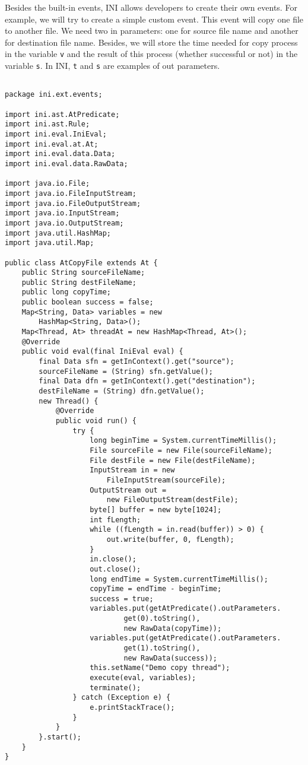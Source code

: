 \documentclass[11pt]{article}
\begin{document}
Besides the built-in events, INI allows developers to create their own events. For example, we will try to create a simple custom event. This event will copy one file to another file. We need two in parameters: one for source file name and another for destination file name. Besides, we will store the time needed for copy process in the variable \texttt{v} and the result of this process (whether successful or not) in the variable \texttt{s}. In INI, \texttt{t} and \texttt{s} are examples of out parameters.
\begin{lstlisting}

package ini.ext.events;

import ini.ast.AtPredicate;
import ini.ast.Rule;
import ini.eval.IniEval;
import ini.eval.at.At;
import ini.eval.data.Data;
import ini.eval.data.RawData;

import java.io.File;
import java.io.FileInputStream;
import java.io.FileOutputStream;
import java.io.InputStream;
import java.io.OutputStream;
import java.util.HashMap;
import java.util.Map;

public class AtCopyFile extends At {
	public String sourceFileName;
	public String destFileName;
	public long copyTime;
	public boolean success = false;
	Map<String, Data> variables = new 
        HashMap<String, Data>();
	Map<Thread, At> threadAt = new HashMap<Thread, At>();
	@Override
	public void eval(final IniEval eval) {
		final Data sfn = getInContext().get("source");
		sourceFileName = (String) sfn.getValue();
		final Data dfn = getInContext().get("destination");
		destFileName = (String) dfn.getValue();
		new Thread() {
			@Override
			public void run() {
				try {
					long beginTime = System.currentTimeMillis();
					File sourceFile = new File(sourceFileName);
					File destFile = new File(destFileName);
					InputStream in = new 
                        FileInputStream(sourceFile);
					OutputStream out = 
                        new FileOutputStream(destFile);
					byte[] buffer = new byte[1024];
					int fLength;
					while ((fLength = in.read(buffer)) > 0) {
						out.write(buffer, 0, fLength);
					}
					in.close();
					out.close();
					long endTime = System.currentTimeMillis();
					copyTime = endTime - beginTime;
					success = true;
					variables.put(getAtPredicate().outParameters.
                            get(0).toString(),
							new RawData(copyTime));
					variables.put(getAtPredicate().outParameters.
                            get(1).toString(),
							new RawData(success));
					this.setName("Demo copy thread");
					execute(eval, variables);
					terminate();
				} catch (Exception e) {
					e.printStackTrace();
				}
			}
		}.start();
	}
}
\end{lstlisting}
\end{document}
